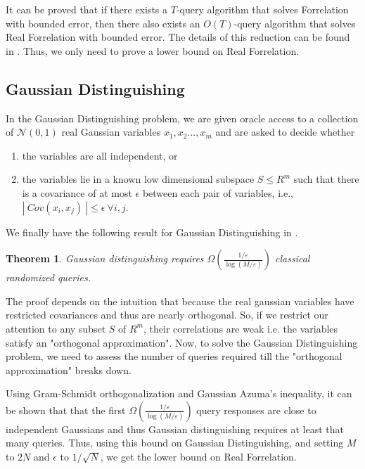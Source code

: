 \documentclass[12pt]{report}
\newtheorem{theorem}{Theorem}
\begin{document}
It can be proved that if there exists a $T$-query algorithm that solves Forrelation with bounded error, then there also exists an $O(T)$-query algorithm that solves Real Forrelation with bounded error. The details of this reduction can be found in \cite{paper1}. Thus, we only need to prove a lower bound on Real Forrelation.

\subsection{Gaussian Distinguishing}
In the Gaussian Distinguishing problem, we are given oracle access to a collection of $\mathcal{N}(0,1)$ real Gaussian variables $x_{1},x_{2}..., x_{m}$ and are asked to decide whether 
\begin{enumerate}
\item the variables are all independent, or
\item the variables lie in a known low dimensional subspace $S \leq R^{m}$ such that there is a covariance of at most $\epsilon$ between each pair of variables, i.e., $ |~Cov(x_{i},x_{j})~| \leq \epsilon ~\forall i,j$.
\end{enumerate}
We finally have the following result for Gaussian Distinguishing in \cite{paper1}.

\begin{theorem}
Gaussian distinguishing requires $\Omega\left(\frac{1 / \varepsilon}{\log (M / \varepsilon)}\right)$ classical randomized queries.
\end{theorem}

The proof depends on the intuition that because the real gaussian variables have restricted covariances and thus are nearly orthogonal. So, if we restrict our attention to any subset $S$ of $R^{m}$, their correlations are weak i.e. the variables satisfy an "orthogonal approximation". Now, to solve the Gaussian Distinguishing problem, we need to assess the number of queries required till the "orthogonal approximation" breaks down.

Using Gram-Schmidt orthogonalization and Gaussian Azuma's inequality, it can be shown that that the first $\Omega\left(\frac{1 / \varepsilon}{\log (M / \varepsilon)}\right)$ query responses are close to independent Gaussians and thus Gaussian distinguishing requires at least that many queries. Thus, using this bound on Gaussian Distinguishing, and setting $M$ to $2N$ and $\epsilon$ to $1/\sqrt{N}$, we get the lower bound on Real Forrelation.
\end{document}
